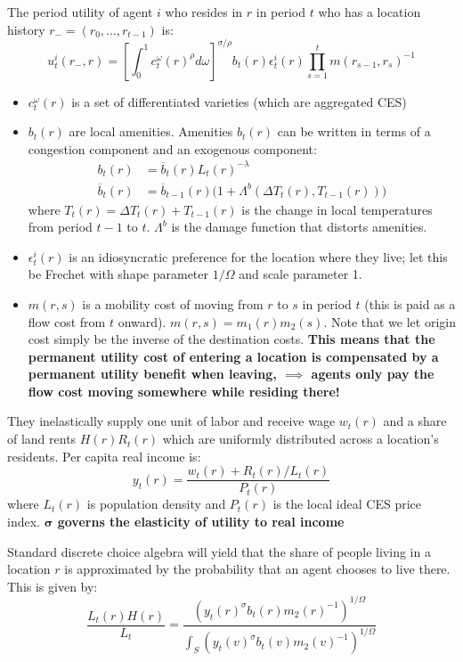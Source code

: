 \documentclass[12pt]{amsart}
\begin{document}
The period utility of agent $i$ who resides in $r$ in period $t$ who has a location history $r_{-} = (r_0, \dots, r_{t-1})$ is:
\begin{equation}
    u^i_t(r_{-}, r) = \left[\int_0^1 c_t^\omega(r)^\rho d\omega\right]^{\sigma/{\rho}} b_t(r) \epsilon_t^i(r) \prod_{s=1}^t m(r_{s-1}, r_s)^{-1} \label{eq:utility}
\end{equation}
\begin{itemize}
    \item $c_t^\omega(r)$ is a set of differentiated varieties (which are aggregated CES) 
    \item $b_t(r)$ are local amenities. Amenities $b_t(r)$ can be written in terms of a congestion component and an exogenous component:
    \begin{align}
        b_t(r) &= \overline{b}_t(r) L_t(r)^{-\lambda} \label{eq:amenities} \\
        \overline{b}_t(r) &= \overline{b}_{t-1}(r) \bigg(1 + \Lambda^b(\Delta T_t(r), T_{t-1}(r))\bigg) \label{eq:fundamental_amenities}
    \end{align}
    where $T_t(r) = \Delta T_t(r) + T_{t-1}(r)$ is the change in local temperatures from period $t-1$ to $t$. $\Lambda^b$ is the damage function that distorts amenities.
    \item $\epsilon_t^i(r)$ is an idiosyncratic preference for the location where they live; let this be Frechet with shape parameter $1/\Omega$ and scale parameter 1.
    \item $m(r,s)$ is a mobility cost of moving from $r$ to $s$ in period $t$ (this is paid as a flow cost from $t$ onward). $m(r,s) = m_1(r) m_2(s)$. Note that we let origin cost simply be the inverse of the destination costs. \textbf{This means that the permanent utility cost of entering a location is compensated by a permanent utility benefit when leaving, $\bm{\implies}$ agents only pay the flow cost moving somewhere while residing there!}
\end{itemize}

They inelastically supply one unit of labor and receive wage $w_t(r)$ and a share of land rents $H(r) R_t(r)$ which are uniformly distributed across a location's residents. Per capita real income is: $$y_t(r) = \frac{w_t(r) + R_t(r) / L_t(r)}{P_t(r)}$$ where $L_t(r)$ is population density and $P_t(r)$ is the local ideal CES price index. \textbf{$\bm{\sigma}$ governs the elasticity of utility to real income}

Standard discrete choice algebra will yield that the share of people living in a location $r$ is approximated by the probability that an agent chooses to live there. This is given by:
\begin{equation}
    \frac{L_t(r) H(r)}{L_t} = \frac{(y_t(r)^\sigma b_t(r) m_2(r)^{-1})^{1/\Omega}}{\int_S (y_t(v)^\sigma b_t(v) m_2(v)^{-1})^{1/\Omega}} \label{eq:prob_moving}
\end{equation}
\end{document}
